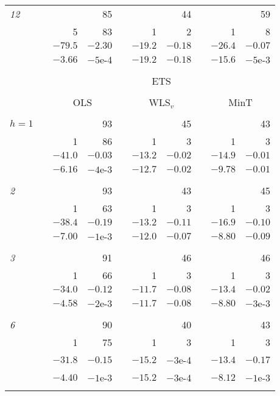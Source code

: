 \documentclass[11pt]{article}
\newcommand{\0}{\phantom{0}}
\begin{document}
\begin{table}[ht]
\begin{threeparttable}
\begin{tabular}{lrrrrrrrrr}
			{\it 12} & & & 85 & & & 44 & & & 59 \\
			& & 5 & 83 & & 1 & 2 & & 1 & 8 \\
			& & $-79.5$ & $-2.30$ & & $-19.2$ & $-0.18$ & & $-26.4$ & $-0.07$ \\
			& & $-3.66$ & $-5$e-4 & & $-19.2$ & $-0.18$ & & $-15.6$ & $-5$e-3 \\
			\cline{3-4} \cline{6-7} \cline{9-10} \\[-0.3cm]
			& & \multicolumn{8}{c}{ETS}\\
			\cline{3-10}\\[-0.3cm]
			& & \multicolumn{2}{c}{OLS} & & \multicolumn{2}{c}{WLS$_{v}$} & & \multicolumn{2}{c}{MinT} \\
			\cline{3-4} \cline{6-7} \cline{9-10} \\[-0.3cm]

			$h = 1$ & & & 93 & & & 45 & & & 43 \\
			& & 1 & 86 & & 1 & 3 & & 1 & 3 \\
			& & $-41.0$ & $-0.03$ & & $-13.2$ & $-0.02$ & & $-14.9$ & $-0.01$ \\
			& & $-6.16$ & $-4$e-3 & & $-12.7$ & $-0.02$ & & $-9.78$ & $-0.01$ \\\\[-0.3cm]

			{\it 2} & & & 93 & & & 43 & & & 45 \\
			& & 1 & 63 & & 1 & 3 & & 1 & 3 \\
			& & $-38.4$ & $-0.19$ & & $-13.2$ & $-0.11$ & & $-16.9$ & $-0.10$ \\
			& & $-7.00$ & $-1$e-3 & & $-12.0$ & $-0.07$ & & $-8.80$ & $-0.09$ \\\\[-0.3cm]

			{\it 3} & & & 91 & & & 46 & & & 46 \\
			& & 1 & 66 & & 1 & 3 & & 1 & 3 \\
			& & $-34.0$ & $-0.12$ & & $-11.7$ & $-0.08$ & & $-13.4$ & $-0.02$ \\
			& & $-4.58$ & $-2$e-3 & & $-11.7$ & $-0.08$ & & $-8.80$ & $-3$e-3 \\\\[-0.3cm]

			{\it 6} & & & 90 & & & 40 & & & 43 \\
			& & 1 & 75 & & 1 & 3 & & 1 & 3 \\
			& & $-31.8$ & $-0.15$ & & $-15.2$ & $-3$e-4 & & $-13.4$ & $-0.17$ \\
			& & $-4.40$ & $-1$e-3 & & $-15.2$ & $-3$e-4 & & $-8.12$ & $-1$e-3 \\\\[-0.3cm]


\end{tabular}
\end{threeparttable}
\end{table}
\end{document}
